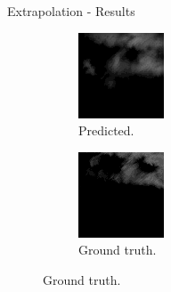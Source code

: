 \documentclass{beamer}
\begin{document}
\begin{frame}{Extrapolation - Results}
	\begin{figure}
	    \begin{subfigure}{.48\linewidth}
	        \centering
	        \includegraphics[width=\linewidth]{fig/extra/out_0.png}
	        \caption{Predicted.}
	    \end{subfigure}
	    \begin{subfigure}{.48\linewidth}
	        \centering
	        \includegraphics[width=\linewidth]{fig/extra/4.png}
	        \caption{Ground truth.}
	    \end{subfigure}
	\end{figure}
\end{frame}
\end{document}
